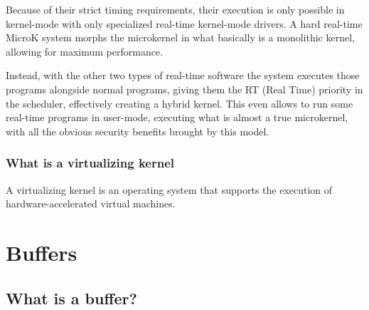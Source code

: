 \documentclass{report}
\begin{document}
Because of their strict timing requirements, their execution is only possible in kernel-mode with only specialized real-time kernel-mode drivers. A hard real-time MicroK system morphs the microkernel in what basically is a monolithic kernel, allowing for maximum performance.

Instead, with the other two types of real-time software the system executes those programs alongside normal programs, giving them the RT (Real Time) priority in the scheduler, effectively creating a hybrid kernel. This even allows to run some real-time programs in user-mode, executing what is almost a true microkernel, with all the obvious security benefits brought by this model.

\subsection{What is a virtualizing kernel}
A virtualizing kernel is an operating system that supports the execution of hardware-accelerated virtual machines.

\chapter{Buffers}
\section{What is a buffer?}
\end{document}
